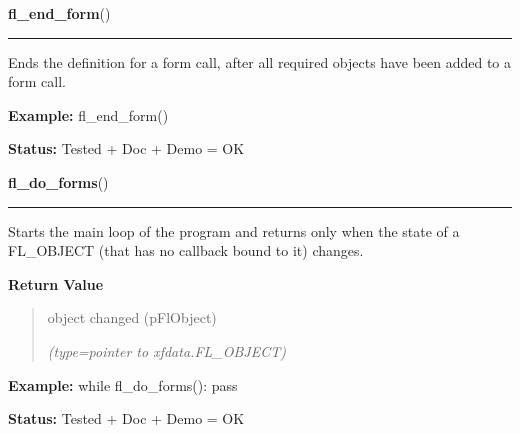     \label{xformslib:flbasic:fl_end_form}

    \vspace{0.5ex}

\hspace{.8\funcindent}\begin{boxedminipage}{\funcwidth}

    \raggedright \textbf{fl\_end\_form}()

    \vspace{-1.5ex}

    \rule{\textwidth}{0.5\fboxrule}
\setlength{\parskip}{2ex}
    Ends the definition for a form call, after all required objects have 
    been added to a form call.

\setlength{\parskip}{1ex}
\textbf{Example:} fl\_end\_form()



\textbf{Status:} Tested + Doc + Demo = OK



    \end{boxedminipage}

    \label{xformslib:flbasic:fl_do_forms}

    \vspace{0.5ex}

\hspace{.8\funcindent}\begin{boxedminipage}{\funcwidth}

    \raggedright \textbf{fl\_do\_forms}()

    \vspace{-1.5ex}

    \rule{\textwidth}{0.5\fboxrule}
\setlength{\parskip}{2ex}
    Starts the main loop of the program and returns only when the state of 
    a FL\_OBJECT (that has no callback bound to it) changes.

\setlength{\parskip}{1ex}
      \textbf{Return Value}
    \vspace{-1ex}

      \begin{quote}
      object changed (pFlObject)

      {\it (type=pointer to xfdata.FL\_OBJECT)}

      \end{quote}

\textbf{Example:} while fl\_do\_forms(): pass



\textbf{Status:} Tested + Doc + Demo = OK



    \end{boxedminipage}

